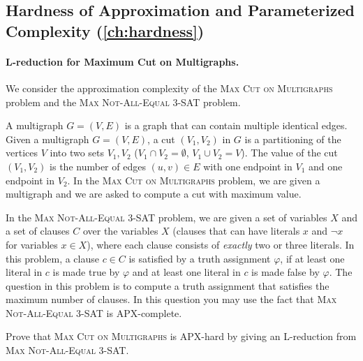 \subsection*{Hardness of Approximation and Parameterized Complexity (\cref{ch:hardness})}

\paragraph{L-reduction for Maximum Cut on Multigraphs.}
We consider the approximation complexity of the \textsc{Max Cut on Multigraphs}
problem and the \textsc{Max Not-All-Equal 3-SAT} problem.

A multigraph $G = (V,E)$ is a graph that can contain multiple identical edges.
Given a multigraph $G = (V,E)$, a cut $(V_1,V_2)$ in $G$ is a partitioning of
the vertices $V$ into two sets $V_1, V_2$ ($V_1 \cap V_2 = \emptyset$,
$V_1 \cup V_2 = V$). The value of the cut $(V_1,V_2)$ is the number of edges
$(u,v) \in E$ with one endpoint in $V_1$ and one endpoint in $V_2$. In the
\textsc{Max Cut on Multigraphs} problem, we are given a multigraph and we are
asked to compute a cut with maximum value.

In the \textsc{Max Not-All-Equal 3-SAT} problem, we are given a set of variables
$X$ and a set of clauses $C$ over the variables $X$ (clauses that can have
literals $x$ and $\lnot x$ for variables $x \in X$), where each clause consists
of \emph{exactly} two or three literals. In this problem, a clause $c \in C$ is
satisfied by a truth assignment $\varphi$, if at least one literal in $c$ is made
true by $\varphi$ and at least one literal in $c$ is made false by $\varphi$. The
question in this problem is to compute a truth assignment that satisfies the
maximum number of clauses. In this question you may use the fact that
\textsc{Max Not-All-Equal 3-SAT} is APX-complete.

Prove that \textsc{Max Cut on Multigraphs} is APX-hard by giving an L-reduction
from \textsc{Max Not-All-Equal 3-SAT}.


